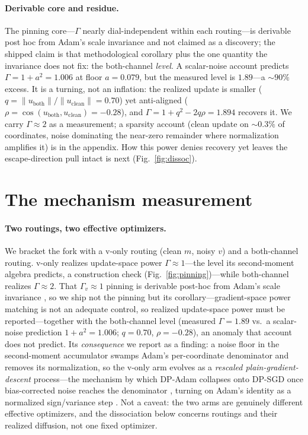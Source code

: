 \documentclass[10pt]{article}
\begin{document}
\paragraph{Derivable core and residue.}
The pinning core---$\Gamma$ nearly dial-independent within each routing---is
derivable post hoc from Adam's scale invariance \citep{adam} and not claimed as a
discovery; the shipped claim is that methodological corollary plus the one
quantity the invariance does not fix: the both-channel \emph{level}. A
scalar-noise account predicts $\Gamma=1+a^2=1.006$ at floor $a=0.079$, but the
measured level is $1.89$---a $\sim\!90\%$ excess. It is a turning, not an
inflation: the realized update is smaller
($q=\lVert u_{\mathrm{both}}\rVert/\lVert u_{\mathrm{clean}}\rVert=0.70$) yet
anti-aligned ($\rho=\cos(u_{\mathrm{both}},u_{\mathrm{clean}})=-0.28$), and
$\Gamma=1+q^2-2q\rho=1.894$ recovers it. We carry $\Gamma\!\approx\!2$ as a
measurement; a sparsity account (clean update on $\sim\!0.3\%$ of coordinates,
noise dominating the near-zero remainder where normalization amplifies it) is in
the appendix. How this power denies recovery yet leaves the escape-direction pull
intact is next (Fig.~\ref{fig:dissoc}).


\section{The mechanism measurement}
\label{sec:mechanism}

\paragraph{Two routings, two effective optimizers.}
We bracket the fork with a v-only routing (clean $m$, noisy $v$) and a
both-channel routing. v-only realizes update-space power $\Gamma\approx1$---the
level its second-moment algebra predicts, a construction check
(Fig.~\ref{fig:pinning})---while both-channel realizes $\Gamma\approx2$. That
$\Gamma_v\approx1$ pinning is derivable post-hoc from Adam's scale invariance
\citep{adam}, so we ship not the pinning but its corollary---gradient-space power
matching is not an adequate control, so realized update-space power must be
reported---together with the both-channel level (measured $\Gamma=1.89$ vs.\ a
scalar-noise prediction $1+a^2=1.006$; $q=0.70$, $\rho=-0.28$), an anomaly that
account does not predict. Its \emph{consequence} we report as a finding: a noise
floor in the second-moment accumulator swamps Adam's per-coordinate denominator
and removes its normalization, so the v-only arm evolves as a \emph{rescaled
plain-gradient-descent} process---the mechanism by which DP-Adam collapses onto
DP-SGD once bias-corrected noise reaches the denominator \citep{dpadambc,litramer},
turning on Adam's identity as a normalized sign/variance step
\citep{adam,balleshennig,kunstner,amsgrad}. Not a caveat: the two arms are
genuinely different effective optimizers, and the dissociation below concerns
routings and their realized diffusion, not one fixed optimizer.
\end{document}

